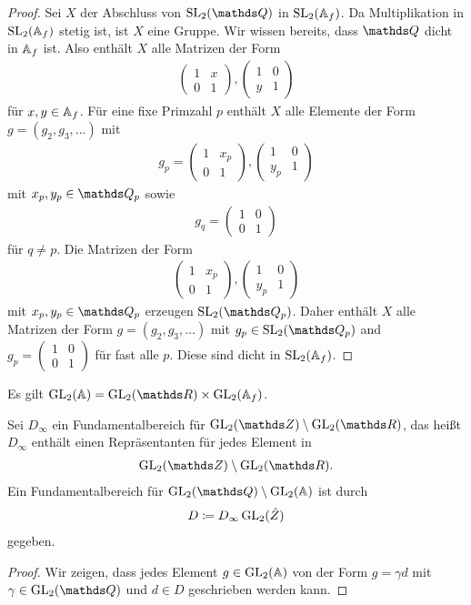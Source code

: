 \begin{proof}
Sei $X$ der Abschluss von $\SL_2(\Q)$ in $\operatorname{SL}_2(\mathbb{A}_f)$.
Da Multiplikation in $\operatorname{SL}_2(\mathbb{A}_f)$ stetig ist, ist $X$ eine Gruppe.
Wir wissen bereits, dass $\Q$ dicht in $\mathbb{A}_f$ ist.
Also enthält $X$ alle Matrizen der Form
\begin{align*}
\begin{pmatrix}
1&x\\
0&1
\end{pmatrix},\begin{pmatrix}
1&0\\
y&1
\end{pmatrix}
\end{align*}
für $x,y\in \mathbb{A}_f$.
Für eine fixe Primzahl $p$ enthält $X$ alle Elemente der Form $g=(g_2,g_3,\dots)$
mit
\begin{align*}
g_p=\begin{pmatrix}
1&x_p\\
0&1
\end{pmatrix},\begin{pmatrix}
1&0\\
y_p&1
\end{pmatrix}
\end{align*}
mit $x_p,y_p \in \Q_p$
sowie
\begin{align*}
g_q=\begin{pmatrix}
1&0\\
0&1
\end{pmatrix}
\end{align*}
für $q\not =p$.
Die Matrizen der Form
\begin{align*}
\begin{pmatrix}
1&x_p\\
0&1
\end{pmatrix},\begin{pmatrix}
1&0\\
y_p&1
\end{pmatrix}
\end{align*}
mit $x_p,y_p \in \Q_p$ erzeugen $\SL_2(\Q_p)$.
Daher enthält $X$ alle Matrizen der Form $g=(g_2,g_3,\dots)$ mit $g_p \in \SL_2(\Q_p)$ and $g_p=\begin{pmatrix}
1&0\\
0&1
\end{pmatrix}$ für fast alle $p$.
Diese sind dicht in $\operatorname{SL}_2(\mathbb{A}_f)$.
\end{proof}

Es gilt $\GL_2(\A)=\GL_2(\R)\times \GL_2(\A_f)$.
\begin{prop}
Sei $D_\infty$ ein Fundamentalbereich für $\GL_2(\Z)\setminus \GL_2(\R)$,
das heißt $D_\infty$ enthält einen Repräsentanten für jedes Element in
\begin{align*}
\GL_2(\Z)\setminus \GL_2(\R).
\end{align*}
Ein Fundamentalbereich für $\GL_2(\Q)\setminus \GL_2(\A)$ ist durch
\begin{align*}
D\coloneqq D_\infty \operatorname{GL}_2(\hat{Z})
\end{align*}
gegeben.
\end{prop}
\begin{proof}
Wir zeigen, dass jedes Element $g\in \operatorname{GL}_2(\mathbb{A})$ von der Form $g=\gamma d$ mit $\gamma \in \GL_2(\Q)$ und $d\in D$ geschrieben werden kann.
\end{proof}